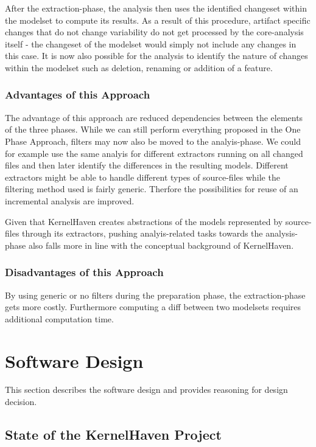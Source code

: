 \documentclass[a4paper]{article}
\begin{document}
After the extraction-phase, the analysis then uses the identified changeset within the modelset to compute its results. As a result of this procedure, artifact specific changes that do not change variability do not get processed by the core-analysis itself - the changeset of the modelset would simply not include any changes in this case. It is now also possible for the analysis to identify the nature of changes within the modelset such as deletion, renaming or addition of a feature.

\subsubsection{Advantages of this Approach}

The advantage of this approach are reduced dependencies between the elements of the three phases. While we can still perform everything proposed in the One Phase Approach, filters may now also be moved to the analyis-phase. We could for example use the same analyis for different extractors running on all changed files and then later identify the differences in the resulting models. Different extractors might be able to handle different types of source-files while the filtering method used is fairly generic. Therfore the possibilities for reuse of an incremental analysis are improved.

Given that KernelHaven creates abstractions of the models represented by source-files through its extractors, pushing analyis-related tasks towards the analysis-phase also falls more in line with the conceptual background of KernelHaven.

\subsubsection{Disadvantages of this Approach}

By using generic or no filters during the preparation phase, the extraction-phase gets more costly. Furthermore computing a diff between two modelsets requires additional computation time.


\clearpage

\section{Software Design}

This section describes the software design and provides reasoning for design decision.

\subsection{State of the KernelHaven Project}
\end{document}
